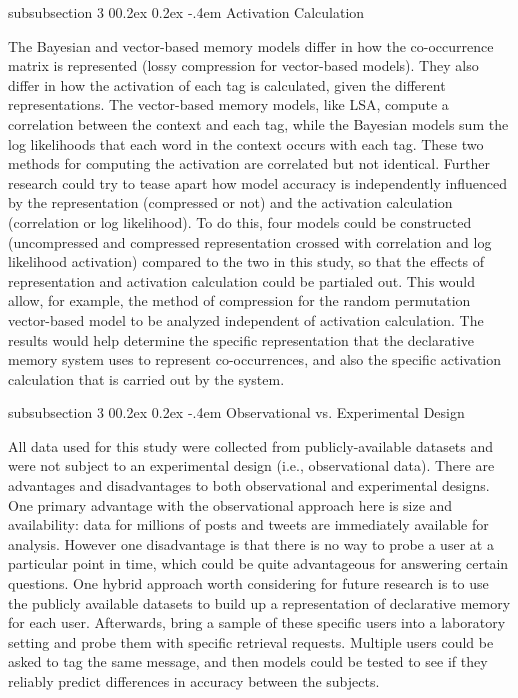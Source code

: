 \documentclass[man,floatsintext,donotrepeattitle]{apa6}
\makeatletter
\renewcommand{\subsubsection}{%
  \@startsection
  {subsubsection}%
  {3}%
  {\parindent}%
  {0\baselineskip \@plus 0.2ex \@minus 0.2ex}%
  {-.4em}%
  {\normalfont\normalsize\bfseries\addperi}}
\makeatother
\begin{document}
\subsubsection{Activation Calculation}

The Bayesian and vector-based memory models differ in how the co-occurrence matrix is represented (lossy compression for vector-based models).
They also differ in how the activation of each tag is calculated, given the different representations.
The vector-based memory models, like LSA, compute a correlation between the context and each tag, while the Bayesian models sum the log likelihoods that each word in the context occurs with each tag.
These two methods for computing the activation are correlated but not identical.
Further research could try to tease apart how model accuracy is independently influenced by the representation (compressed or not) and the activation calculation (correlation or log likelihood).
To do this, four models could be constructed (uncompressed and compressed representation crossed with correlation and log likelihood activation) compared to the two in this study,
so that the effects of representation and activation calculation could be partialed out.
This would allow, for example, the method of compression for the random permutation vector-based model to be analyzed independent of activation calculation.
The results would help determine the specific representation that the declarative memory system uses to represent co-occurrences,
and also the specific activation calculation that is carried out by the system.

\subsubsection{Observational vs. Experimental Design}

All data used for this study were collected from publicly-available datasets and were not subject to an experimental design (i.e., observational data).
There are advantages and disadvantages to both observational and experimental designs.
One primary advantage with the observational approach here is size and availability: data for millions of posts and tweets are immediately available for analysis.
However one disadvantage is that there is no way to probe a user at a particular point in time, which could be quite advantageous for answering certain questions.
One hybrid approach worth considering for future research is to use the publicly available datasets to build up a representation of declarative memory for each user.
Afterwards, bring a sample of these specific users into a laboratory setting and probe them with specific retrieval requests.
Multiple users could be asked to tag the same message, and then models could be tested to see if they reliably predict differences in accuracy between the subjects.
\end{document}

